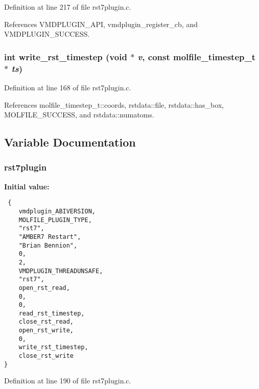 Definition at line 217 of file rst7plugin.c.

References VMDPLUGIN\_\-API, vmdplugin\_\-register\_\-cb, and VMDPLUGIN\_\-SUCCESS.
\subsubsection{\setlength{\rightskip}{0pt plus 5cm}int write\_\-rst\_\-timestep (void $\ast$ {\em v}, const {\bf molfile\_\-timestep\_\-t} $\ast$ {\em ts})\hspace{0.3cm}{\tt  [static]}}\label{rst7plugin_8c_a5}




Definition at line 168 of file rst7plugin.c.

References molfile\_\-timestep\_\-t::coords, rstdata::file, rstdata::has\_\-box, MOLFILE\_\-SUCCESS, and rstdata::numatoms.

\subsection{Variable Documentation}
\subsubsection{ rst7plugin\hspace{0.3cm}{\tt  [static]}}\label{rst7plugin_8c_a0}


{\bf Initial value:}

\footnotesize\begin{verbatim} {
    vmdplugin_ABIVERSION,   
    MOLFILE_PLUGIN_TYPE,    
    "rst7",                 
    "AMBER7 Restart",       
    "Brian Bennion",        
    0,                      
    2,                      
    VMDPLUGIN_THREADUNSAFE, 
    "rst7",                 
    open_rst_read,
    0,
    0,
    read_rst_timestep,
    close_rst_read,
    open_rst_write,
    0,
    write_rst_timestep,
    close_rst_write
}\end{verbatim}\normalsize 


Definition at line 190 of file rst7plugin.c.